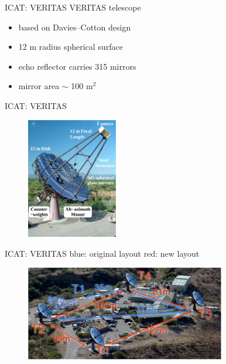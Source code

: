 \documentclass{beamer}
\begin{document}
\begin{frame}{ICAT: VERITAS}
    VERITAS telescope
    \begin{itemize}
        \item based on Davies–Cotton design
        \item 12 m radius spherical surface
        \item echo reflector carries 315 mirrors
        \item mirror area $\sim$ 100 $ \text{m}^2$
    \end{itemize}
\end{frame}


\begin{frame}{ICAT: VERITAS}
    \begin{figure}[h]
        \includegraphics[width=150px]{VERITAS_telescope.png}
    \end{figure}
\end{frame}


\begin{frame}{ICAT: VERITAS}
    blue: original layout
    \newline
    red: new layout
    \begin{figure}[h]
        \includegraphics[width=330px]{VERITAS_array.png}
    \end{figure}
\end{frame}
\end{document}
